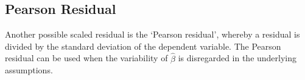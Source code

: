 \documentclass[main.tex]{subfiles}
\begin{document}

\subsection{Pearson Residual}%

Another possible scaled residual is the  `Pearson residual', whereby a residual is divided by the standard deviation of the dependent variable. The Pearson residual can be used when the variability of $\hat{\beta}$ is disregarded in the underlying assumptions.
\end{document}
